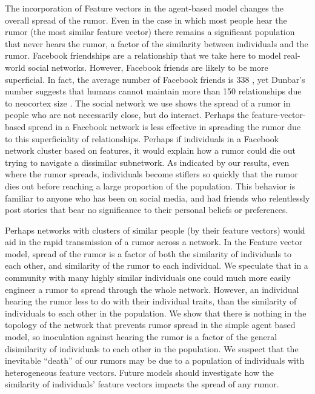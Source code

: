 The incorporation of Feature vectors in the agent-based model changes the overall spread of the rumor. Even in the case in which most people hear the rumor (the most similar feature vector) there remains a significant population that never hears the rumor, a factor of the similarity between individuals and the rumor. Facebook friendships are a relationship that we take here to model real-world social networks. However, Facebook friends are likely to be more superficial. In fact, the average number of Facebook friends is 338 \cite{smith-2014}, yet Dunbar's number suggests that humans cannot maintain more than 150 relationships due to neocortex size \cite{dunbar-1992}. The social network we use shows the spread of a rumor in people who are not necessarily close, but do interact. Perhaps the feature-vector-based spread in a Facebook network is less effective in spreading the rumor due to this superficiality of relationships. Perhaps if individuals in a Facebook network cluster based on features, it would explain how a rumor could die out trying to navigate a dissimilar subnetwork. As indicated by our results, even where the rumor spreads, individuals become stiflers so quickly that the rumor dies out before reaching a large proportion of the population. This behavior is familiar to anyone who has been on social media, and had friends who relentlessly post stories that bear no significance to their personal beliefs or preferences.

Perhaps networks with clusters of similar people (by their feature vectors) would aid in the rapid transmission of a rumor across a network. In the Feature vector model, spread of the rumor is a factor of both the similarity of individuals to each other, and similarity of the rumor to each individual. We speculate that in a community with many highly similar individuals one could much more easily engineer a rumor to spread through the whole network. However, an individual hearing the rumor less to do with their individual traits, than the similarity of individuals to each other in the population. We show that there is nothing in the topology of the network that prevents rumor spread in the simple agent based model, so inoculation against hearing the rumor is a factor of the general disimilarity of individuals to each other in the population. We suspect that the inevitable ``death'' of our rumors may be due to a population of individuals with heterogeneous feature vectors. Future models should investigate how the similarity of individuals' feature vectors impacts the spread of any rumor.

